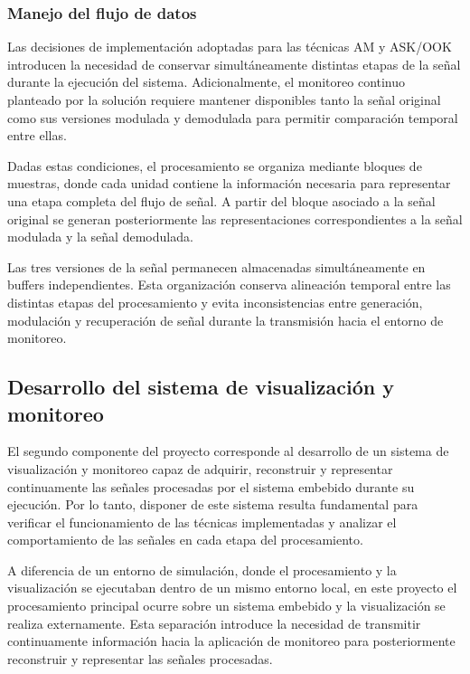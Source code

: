 \label{subsec:flow_control}
\subsubsection{Manejo del flujo de datos}

Las decisiones de implementación adoptadas para las técnicas AM y ASK/OOK introducen la necesidad de conservar simultáneamente distintas etapas de la señal durante la ejecución del sistema. Adicionalmente, el monitoreo continuo planteado por la solución requiere mantener disponibles tanto la señal original como sus versiones modulada y demodulada para permitir comparación temporal entre ellas.

Dadas estas condiciones, el procesamiento se organiza mediante bloques de muestras, donde cada unidad contiene la información necesaria para representar una etapa completa del flujo de señal. A partir del bloque asociado a la señal original se generan posteriormente las representaciones correspondientes a la señal modulada y la señal demodulada.

Las tres versiones de la señal permanecen almacenadas simultáneamente en buffers independientes. Esta organización conserva alineación temporal entre las distintas etapas del procesamiento y evita inconsistencias entre generación, modulación y recuperación de señal durante la transmisión hacia el entorno de monitoreo.




\subsection{Desarrollo del sistema de visualización y monitoreo}

El segundo componente del proyecto corresponde al desarrollo de un sistema de visualización y monitoreo capaz de adquirir, reconstruir y representar continuamente las señales procesadas por el sistema embebido durante su ejecución. Por lo tanto, disponer de este sistema resulta fundamental para verificar el funcionamiento de las técnicas implementadas y analizar el comportamiento de las señales en cada etapa del procesamiento.

A diferencia de un entorno de simulación, donde el procesamiento y la visualización se ejecutaban dentro de un mismo entorno local, en este proyecto el procesamiento principal ocurre sobre un sistema embebido y la visualización se realiza externamente. Esta separación introduce la necesidad de transmitir continuamente información hacia la aplicación de monitoreo para posteriormente reconstruir y representar las señales procesadas.

